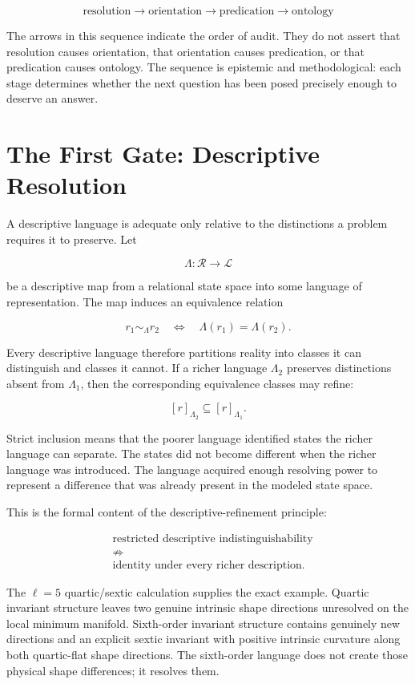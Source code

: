 \[
\boxed{
\text{resolution}
\longrightarrow
\text{orientation}
\longrightarrow
\text{predication}
\longrightarrow
\text{ontology}
}
\]

The arrows in this sequence indicate the order of audit. They do not assert that resolution causes orientation, that orientation causes predication, or that predication causes ontology. The sequence is epistemic and methodological: each stage determines whether the next question has been posed precisely enough to deserve an answer.

\section{The First Gate: Descriptive Resolution}

A descriptive language is adequate only relative to the distinctions a problem requires it to preserve. Let

\[
\Lambda:\mathscr R\longrightarrow\mathcal L
\]

be a descriptive map from a relational state space into some language of representation. The map induces an equivalence relation

\[
r_1\sim_{\Lambda}r_2
\quad\Longleftrightarrow\quad
\Lambda(r_1)=\Lambda(r_2).
\]

Every descriptive language therefore partitions reality into classes it can distinguish and classes it cannot. If a richer language \(\Lambda_2\) preserves distinctions absent from \(\Lambda_1\), then the corresponding equivalence classes may refine:

\[
[r]_{\Lambda_2}\subseteq[r]_{\Lambda_1}.
\]

Strict inclusion means that the poorer language identified states the richer language can separate. The states did not become different when the richer language was introduced. The language acquired enough resolving power to represent a difference that was already present in the modeled state space.

This is the formal content of the descriptive-refinement principle:

\[
\boxed{
\begin{aligned}
&\text{restricted descriptive indistinguishability}\\
&\not\Rightarrow\\
&\text{identity under every richer description}.
\end{aligned}
}
\]

The \(\ell=5\) quartic/sextic calculation supplies the exact example. Quartic invariant structure leaves two genuine intrinsic shape directions unresolved on the local minimum manifold. Sixth-order invariant structure contains genuinely new directions and an explicit sextic invariant with positive intrinsic curvature along both quartic-flat shape directions. The sixth-order language does not create those physical shape differences; it resolves them.

